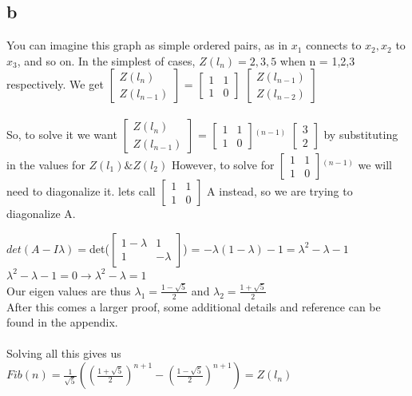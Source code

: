 \documentclass[12pt]{article}
\begin{document}
\subsection{b}

You can imagine this graph as simple ordered pairs, as in $x_1$ connects to $x_2, x_2$ to $x_3$, and so on. In the simplest of cases, $Z(l_n) = 2,3,5$ when n = 1,2,3 respectively. We get 
$\begin{bmatrix}
	Z(l_n) \\
	Z(l_{n-1})
\end{bmatrix}$ = 
$\begin{bmatrix}
1&1 \\
1&0
\end{bmatrix}$
$\begin{bmatrix}
Z(l_{n-1}) \\
Z(l_{n-2})
\end{bmatrix}$
\\
\\
So, to solve it we want 
$\begin{bmatrix}
Z(l_n) \\
Z(l_{n-1})
\end{bmatrix}$ = 
$\begin{bmatrix}
1&1 \\
1&0
\end{bmatrix}$$^{(n-1)}$
$\begin{bmatrix}
3 \\
2
\end{bmatrix}$
by substituting in the values for $Z(l_1) \& Z(l_2)$ However, to solve for $\begin{bmatrix}
1&1 \\
1&0
\end{bmatrix}$$^{(n-1)}$ we will need to diagonalize it. lets call $\begin{bmatrix}
1&1 \\
1&0
\end{bmatrix}$ A instead, so we are trying to diagonalize A.

$det(A-I\lambda) = $det($\begin{bmatrix}
1-\lambda&1 \\
1&-\lambda
\end{bmatrix}$) = $-\lambda(1-\lambda) - 1 = \lambda^2 - \lambda -1$
\\
$\lambda^2 - \lambda -1 = 0 \rightarrow \lambda^2 - \lambda = 1$
\\
Our eigen values are thus $\lambda_1 = \frac{1-\sqrt{5}}{2}$ and $\lambda_2= \frac{1+\sqrt{5}}{2}$ \\
After this comes a larger proof, some additional details and reference can be found in the appendix.
\\
\\
Solving all this gives us $Fib(n) = \frac{1}{\sqrt5}((\frac{1+\sqrt5}{2})^{n+1} - (\frac{1-\sqrt5}{2})^{n+1}) = Z(l_n)$
\end{document}
